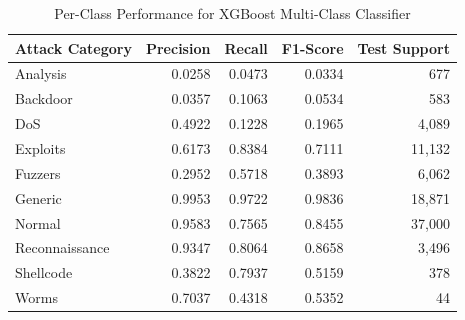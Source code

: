 \begin{table}[htbp]
\caption{Per-Class Performance for XGBoost Multi-Class Classifier}
\label{tab:per_class_results}
\centering
\begin{tabular}{lrrrr}
\hline
\textbf{Attack Category} & \textbf{Precision} & \textbf{Recall} & \textbf{F1-Score} & \textbf{Test Support} \\ 
\hline
Analysis & 0.0258 & 0.0473 & 0.0334 & 677 \\
Backdoor & 0.0357 & 0.1063 & 0.0534 & 583 \\
DoS & 0.4922 & 0.1228 & 0.1965 & 4,089 \\
Exploits & 0.6173 & 0.8384 & 0.7111 & 11,132 \\
Fuzzers & 0.2952 & 0.5718 & 0.3893 & 6,062 \\
Generic & 0.9953 & 0.9722 & 0.9836 & 18,871 \\
Normal & 0.9583 & 0.7565 & 0.8455 & 37,000 \\
Reconnaissance & 0.9347 & 0.8064 & 0.8658 & 3,496 \\
Shellcode & 0.3822 & 0.7937 & 0.5159 & 378 \\
Worms & 0.7037 & 0.4318 & 0.5352 & 44 \\
\hline
\end{tabular}
\end{table}
